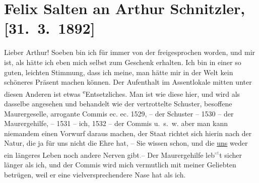 

\renewcommand{\erwaehntePersonen}{Personen:  ?? [Partnerin von Felix Salten, Ende März 1892], Felix Salten}
\renewcommand{\erwaehnteOrte}{Orte: Café Kremser, Kettenbrücke, Wien}
\renewcommand{\erwaehnteWerke}{Werke: Tagebuch}
\section[Felix Salten an Arthur Schnitzler, {[}31. 3. 1892{]}]{Felix Salten an Arthur Schnitzler, {[}31. 3. 1892{]}}
\nopagebreak{}
\rehead{ }\normalsize\beginnumbering{}
\toendnotes[C]{\smallbreak\pagebreak[2]}
\toendnotes[C]{\smallbreak}
\pstart
           \noindent{}{\pb}Lieber Arthur! Soeben bin ich für immer von der
                  \label{K_L03108-1v}\label{K_L03108-1h}
               freigesprochen worden, und mir ist, als hätte ich eben mich selbst zum Geschenk
               erhalten. Ich bin in einer so guten, leichten Stimmung, dass ich meine, man hätte mir
               in der Welt kein schöneres Präsent machen können. Der Aufenthalt {\pb}im Assentlokale mitten
               unter diesen Anderen ist etwas \substVorne{}\textsuperscript{e}\substDazwischen{}E\substHinten{}ntsetzliches. Man ist wie diese hier, und wird als
               dasselbe angesehen und behandelt wie der vertrottelte Schuster, besoffene
               Maurergeselle, arrogante Commis ec. ec. 1529, – der Schuster – 1530 – der
               Maurergehilfe, – 1531 – ich, 1532 – der Commis u. s. w. aber man kann niemandem einen
               Vorwurf daraus machen, der Staat richtet {\pb}sich hierin nach der
               Natur, die ja für uns nicht die Ehre hat, – Sie wissen schon, und die \uline{uns} weder ein längeres Leben noch andere Nerven
                  gibt\textcolor{gray}{.}– Der Maurergehilfe leb\substVorne{}\textsuperscript{\textcolor{gray}{st}}\substDazwischen{}t\substHinten{} sicher länger als ich, und der Commis wird mich vermutlich mit meiner
               Geliebten betrügen, weil er eine vielversprechendere Nase hat als ich.\pend
           
